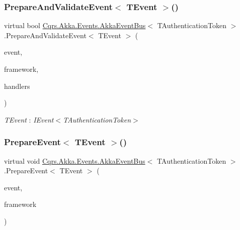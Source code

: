 \subsubsection{\texorpdfstring{Prepare\+And\+Validate\+Event$<$ T\+Event $>$()}{PrepareAndValidateEvent< TEvent >()}}
{\footnotesize\ttfamily virtual bool \hyperlink{classCqrs_1_1Akka_1_1Events_1_1AkkaEventBus}{Cqrs.\+Akka.\+Events.\+Akka\+Event\+Bus}$<$ T\+Authentication\+Token $>$.Prepare\+And\+Validate\+Event$<$ T\+Event $>$ (\begin{DoxyParamCaption}\item[{T\+Event @}]{event,  }\item[{string}]{framework,  }\item[{out I\+Enumerable$<$ \hyperlink{classCqrs_1_1Bus_1_1RouteHandlerDelegate}{Route\+Handler\+Delegate} $>$}]{handlers }\end{DoxyParamCaption})\hspace{0.3cm}{\ttfamily [virtual]}}

\begin{Desc}
\item[Type Constraints]\begin{description}
\item[{\em T\+Event} : {\em I\+Event$<$T\+Authentication\+Token$>$}]\end{description}
\end{Desc}
\mbox{\label{classCqrs_1_1Akka_1_1Events_1_1AkkaEventBus_ae9d248ec73204a7909c04e5a87bfeefb}} 
\subsubsection{\texorpdfstring{Prepare\+Event$<$ T\+Event $>$()}{PrepareEvent< TEvent >()}}
{\footnotesize\ttfamily virtual void \hyperlink{classCqrs_1_1Akka_1_1Events_1_1AkkaEventBus}{Cqrs.\+Akka.\+Events.\+Akka\+Event\+Bus}$<$ T\+Authentication\+Token $>$.Prepare\+Event$<$ T\+Event $>$ (\begin{DoxyParamCaption}\item[{T\+Event @}]{event,  }\item[{string}]{framework }\end{DoxyParamCaption})\hspace{0.3cm}{\ttfamily [virtual]}}

